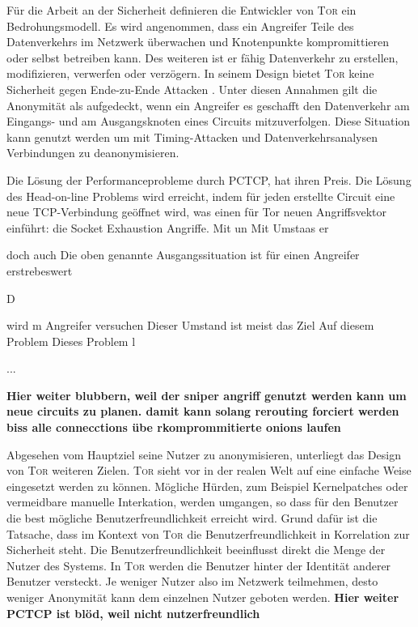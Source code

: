 \documentclass[fleqn,envcountsame,runningheads,10pt,a4paper]{llncs}
\begin{document}
Für die Arbeit an der Sicherheit definieren die Entwickler von \textsc{Tor} ein Bedrohungsmodell. Es wird angenommen, dass ein Angreifer Teile des Datenverkehrs im Netzwerk überwachen und Knotenpunkte kompromittieren oder selbst betreiben kann. Des weiteren ist er fähig Datenverkehr zu erstellen, modifizieren, verwerfen oder verzögern. In seinem Design bietet \textsc{Tor} keine Sicherheit gegen Ende-zu-Ende Attacken \cite{tor}. Unter diesen Annahmen gilt die Anonymität als aufgedeckt, wenn ein Angreifer es geschafft den Datenverkehr am Eingangs- und am Ausgangsknoten eines Circuits mitzuverfolgen. Diese Situation kann genutzt werden um mit Timing-Attacken und Datenverkehrsanalysen Verbindungen zu deanonymisieren.

Die Lösung der Performanceprobleme durch PCTCP, hat ihren Preis. Die Lösung des Head-on-line Problems wird erreicht, indem für jeden erstellte Circuit eine neue TCP-Verbindung geöffnet wird, was einen für Tor neuen Angriffsvektor einführt: die Socket Exhaustion Angriffe. Mit un Mit    Umstaas er

doch auch Die oben genannte Ausgangssituation ist für einen Angreifer erstrebeswert


D

wird m Angreifer versuchen Dieser Umstand ist meist das Ziel Auf diesem Problem Dieses Problem l



...


\textbf{Hier weiter blubbern, weil der sniper angriff genutzt werden kann um neue circuits zu planen. damit kann solang rerouting forciert werden biss alle connecctions übe rkomprommitierte onions laufen}


Abgesehen vom Hauptziel seine Nutzer zu anonymisieren, unterliegt das Design von \textsc{Tor} weiteren Zielen. \textsc{Tor} sieht vor in der realen Welt auf eine einfache Weise eingesetzt werden zu können. Mögliche Hürden, zum Beispiel Kernelpatches oder vermeidbare manuelle Interkation, werden umgangen, so dass für den Benutzer die best mögliche Benutzerfreundlichkeit erreicht wird. Grund dafür ist die Tatsache, dass im Kontext von \textsc{Tor} die Benutzerfreundlichkeit in Korrelation zur Sicherheit steht. Die Benutzerfreundlichkeit beeinflusst direkt die Menge der Nutzer des Systems. In \textsc{Tor} werden die Benutzer hinter der Identität anderer Benutzer versteckt. Je weniger Nutzer also im Netzwerk teilmehmen, desto weniger Anonymität kann dem einzelnen Nutzer geboten werden. \textbf{Hier weiter PCTCP ist blöd, weil nicht nutzerfreundlich}
\end{document}
